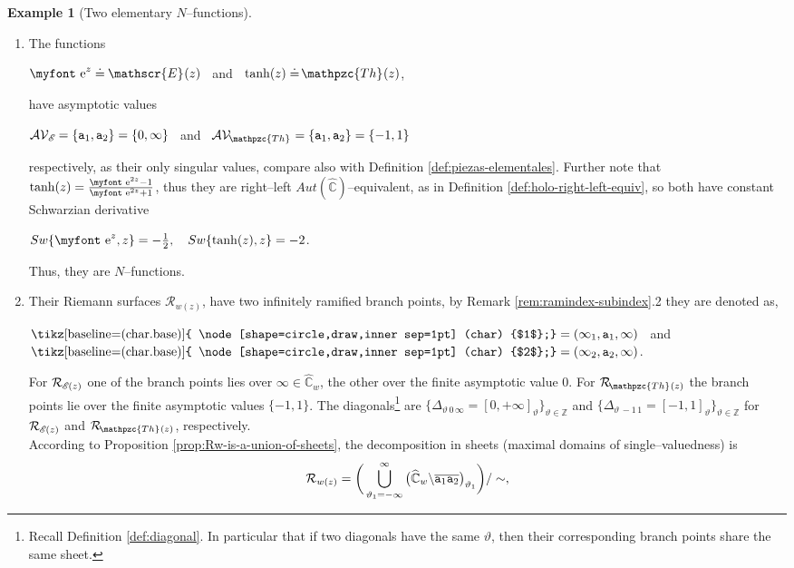 \documentclass[final,3p,times]{elsarticle}
\newcommand{\ZZ}{\ensuremath{{\mathbb Z}}}
\newcommand{\CW}{\ensuremath{{\widehat{\mathbb C}}}}
\newcommand{\R}{\ensuremath{{\mathcal R}}}
\newcommand{\e}{{\text{\myfont e}}}
\newcommand{\ent}[2]{{}_{#1}\hspace{-1pt}\mathscr{E}_{#2}}
\newcommand{\htan}[2]{{}_{#1}\hspace{-2pt}\mathpzc{Th}_{#2}}    %
\newcommand{\circled}[1]{ \text{\tikz[baseline=(char.base)]{
    \node[shape=circle,draw,inner sep=1pt] (char) {$#1$};}} }
\theoremstyle{definition}
\newtheorem{example}{Example}[section]
\begin{document}
\begin{example}[Two elementary $N$--functions]
\label{example:N-exp-tanh}
\hfill
\begin{enumerate}[label=\alph*),leftmargin=*]
\item
The functions 

\centerline{
$\e^z  \doteq  \ent{}{} (z)$ 
\ and \
$\tanh(z) \doteq \htan{}{}  (z)$,
}



\noindent
have asymptotic values 

\centerline{$\mathcal{AV}_{\ent{}{}} = \{ {\tt a}_1, {\tt a}_2 \} = \{0,\infty\}$ 
\ and \ 
$\mathcal{AV}_{\htan{}{} } = \{ {\tt a}_1, {\tt a}_2 \} = \{-1,1\}$}


\noindent 
respectively,
as their only singular values, compare also with Definition \ref{def:piezas-elementales}.
Further note that
$\tanh(z) = \frac{\e^{2z} - 1}{\e^{2z} + 1}$,
thus they are right--left $Aut(\CW)$--equivalent,
as in Definition \ref{def:holo-right-left-equiv},
so both have constant
Schwarzian derivative 

\centerline{
$Sw\{ \e^z, z \} = -\frac{1}{2}, 
\quad 
Sw\{ \tanh(z) , z \} = -2$.
}

\noindent 
Thus, they are $N$--functions.

\item
Their Riemann surfaces 
$\R_{w(z)}$, 
have two infinitely ramified branch points,
by Remark \ref{rem:ramindex-subindex}.2 they are denoted as,

\centerline{
$\circled{1}=(\infty_1, {\tt a}_1, \infty)$ 
\ and \ 
$\circled{2}=(\infty_2, {\tt a}_2, \infty)$.
}

\noindent  
For $\R_{\ent{}{}(z)}$ one of the branch points lies over $\infty\in\CW_w$, 
the other over the finite asymptotic value $0$.
For $\R_{\htan{}{} (z)}$ the branch points lie over the finite asymptotic values
$\{-1,1\}$.
The diagonals\footnote{
Recall Definition \ref{def:diagonal}.
In particular that if two diagonals have the same $\vartheta$, then their 
corresponding  branch points share the same sheet.
}
are $\{ \Delta_{\vartheta\, 0\, \infty} = [0,+\infty]_\vartheta \}_{\vartheta\in\ZZ}$ and 
$\{ \Delta_{\vartheta\, -1\, 1} = [-1,1]_\vartheta \}_{\vartheta\in\ZZ}$ 
for $\R_{\ent{}{} (z)}$ and $\R_{\htan{}{} (z)}$,
respectively.
\\
According to Proposition \ref{prop:Rw-is-a-union-of-sheets},
the decomposition in sheets (maximal domains of single--valuedness) is
$$
\R_{w(z)} = 
\bigg(
\bigcup_{\vartheta_1=-\infty}^{\infty} \big( \CW_w \backslash  
\overline{{\tt a}_{1} {\tt a}_{2} } 
\big)_{\vartheta_1}  
\bigg) / \sim ,
$$


\end{enumerate}
\end{example}
\end{document}
